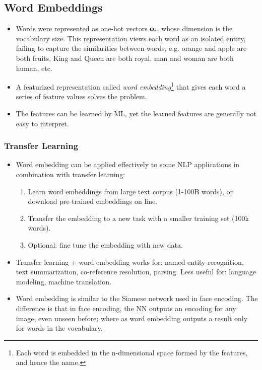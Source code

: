 \subsection{Word Embeddings}
\begin{itemize}
  \item Words were represented as one-hot vectors $\mathbf{o}_{i}$, whose dimension is the vocabulary size. This representation views each word as an isolated entity, failing to capture the similarities between words, e.g. orange and apple are both fruits, King and Queen are both royal, man and woman are both human, etc. 
  \item A featurized representation called \textit{word embedding}\footnote{Each word is embedded in the n-dimensional space formed by the features, and hence the name.} that gives each word a series of feature values solves the problem. 
  \item The features can be learned by ML, yet the learned features are generally not easy to interpret. 
\end{itemize}
\subsubsection{Transfer Learning}
\begin{itemize}
  \item Word embedding can be applied effectively to some NLP applications in combination with transfer learning:
    \begin{enumerate}
      \item Learn word embeddings from large text corpus (1-100B words), or download pre-trained embeddings on line.
      \item Transfer the embedding to a new task with a smaller training set (100k words).
      \item Optional: fine tune the embedding with new data.
    \end{enumerate}
  \item Transfer learning + word embedding works for: named entity recognition, text summarization, co-reference resolution, parsing. Less useful for: language modeling, machine translation.
  \item Word embedding is similar to the Siamese network used in face encoding. The difference is that in face encoding, the NN outputs an encoding for any image, even unseen before; where as word embedding outputs a result only for words in the vocabulary.
\end{itemize}
